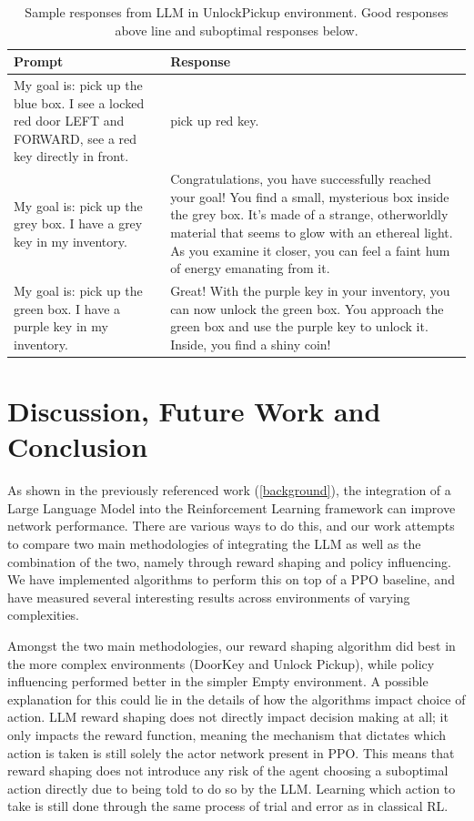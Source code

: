 \documentclass[conference]{IEEEtran}
\begin{document}
\begin{table}[h]
\caption{Sample responses from LLM in UnlockPickup environment. Good responses above line and suboptimal responses below.}
\begin{center}
\label{unlockpickupresponses}
\begin{tabularx}{3.25in}{X | X}
Prompt & Response \\
\hline
My goal is: pick up the blue box. I see a locked red door LEFT and FORWARD, see a red key directly in front. & pick up red key. \\
\hline
My goal is: pick up the grey box. I have a grey key in my inventory. & Congratulations, you have successfully reached your goal! You find a small, mysterious box inside the grey box. It's made of a strange, otherworldly material that seems to glow with an ethereal light. As you examine it closer, you can feel a faint hum of energy emanating from it. \\
My goal is: pick up the green box. I have a purple key in my inventory. & Great! With the purple key in your inventory, you can now unlock the green box. You approach the green box and use the purple key to unlock it. Inside, you find a shiny coin!
\end{tabularx}
\end{center}
\end{table}


\section{Discussion, Future Work and Conclusion}

As shown in the previously referenced work (\ref{background}), the integration of a Large Language Model into the Reinforcement Learning framework can improve network performance. There are various ways to do this, and our work attempts to compare two main methodologies of integrating the LLM as well as the combination of the two, namely through reward shaping and policy influencing. We have implemented algorithms to perform this on top of a PPO baseline, and have measured several interesting results across environments of varying complexities.

Amongst the two main methodologies, our reward shaping algorithm did best in the more complex environments (DoorKey and Unlock Pickup), while policy influencing performed better in the simpler Empty environment. A possible explanation for this could lie in the details of how the algorithms impact choice of action. LLM reward shaping does not directly impact decision making at all; it only impacts the reward function, meaning the mechanism that dictates which action is taken is still solely the actor network present in PPO. This means that reward shaping does not introduce any risk of the agent choosing a suboptimal action directly due to being told to do so by the LLM. Learning which action to take is still done through the same process of trial and error as in classical RL.
\end{document}

